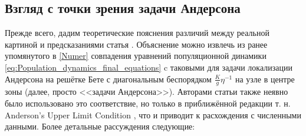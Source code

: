 \subsection{Взгляд с точки зрения задачи Андерсона}
Прежде всего, дадим теоретические пояснения различий между реальной картиной и предсказаниями статья \cite{FI_microwave}. Объяснение можно извлечь из ранее упомянутого в \autoref{Numer} совпадения уравнений популяционной динамики \eqref{eq:Population_dynamics_final_equations} c таковыми для задачи локализации Андерсона на решётке Бете с диагональным беспорядком $\frac{K}{g} \eta^{-1}$ на узле в центре зоны (далее, просто <<задачи Андерсона>>). Авторами статьи \cite{FI_microwave} также неявно было использовано это соответствие, но только в приближённой редакции т. н. Anderson's Upper Limit Condition \cite{AAT}, что и приводит к расхождения с численными данными. Более детальные рассуждения следующие:
